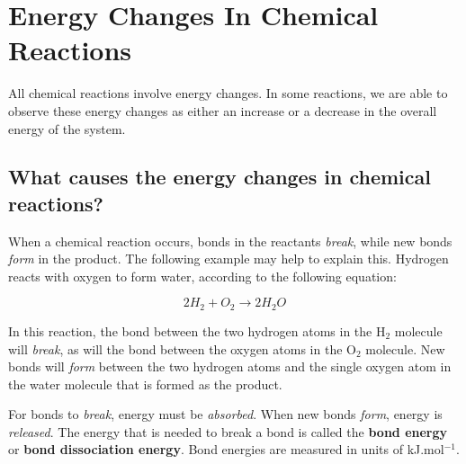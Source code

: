 






\chapter{Energy Changes In Chemical Reactions}
\label{chap:energychanges}

All chemical reactions involve energy changes. In some reactions, we are able to observe these energy changes as either an increase or a decrease in the overall energy of the system.



\section{What causes the energy changes in chemical reactions?}

When a chemical reaction occurs, bonds in the reactants \textit{break}, while new bonds \textit{form} in the product. The following example may help to explain this.
Hydrogen reacts with oxygen to form water, according to the following equation:

\begin{equation*}
2H_{2} + O_{2} \rightarrow 2H_{2}O 
\label{eqnfirst:ec:ec}
\end{equation*}

In this reaction, the bond between the two hydrogen atoms in the H$_{2}$ molecule will \textit{break}, as will the bond between the oxygen atoms in the O$_{2}$ molecule. New bonds will \textit{form} between the two hydrogen atoms and the single oxygen atom in the water molecule that is formed as the product.

For bonds to \textit{break}, energy must be \textit{absorbed}. When new bonds \textit{form}, energy is \textit{released}. The energy that is needed to break a bond is called the \textbf{bond energy} or \textbf{bond dissociation energy}. Bond energies are measured in units of kJ.mol$^{-1}$. 







